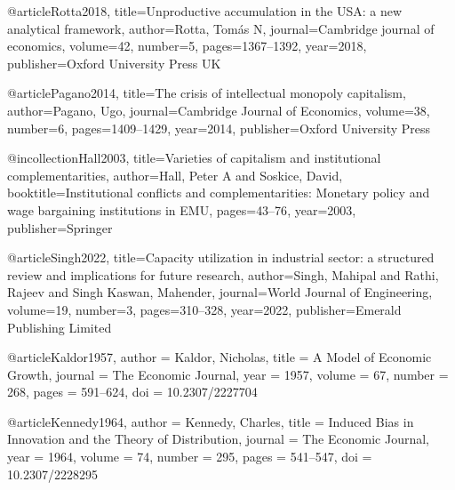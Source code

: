 @article{Rotta2018,
	title={Unproductive accumulation in the USA: a new analytical framework},
	author={Rotta, Tom{\'a}s N},
	journal={Cambridge journal of economics},
	volume={42},
	number={5},
	pages={1367--1392},
	year={2018},
	publisher={Oxford University Press UK}
}

@article{Pagano2014,
	title={The crisis of intellectual monopoly capitalism},
	author={Pagano, Ugo},
	journal={Cambridge Journal of Economics},
	volume={38},
	number={6},
	pages={1409--1429},
	year={2014},
	publisher={Oxford University Press}
}


@incollection{Hall2003,
	title={Varieties of capitalism and institutional complementarities},
	author={Hall, Peter A and Soskice, David},
	booktitle={Institutional conflicts and complementarities: Monetary policy and wage bargaining institutions in EMU},
	pages={43--76},
	year={2003},
	publisher={Springer}
}



@article{Singh2022,
	title={Capacity utilization in industrial sector: a structured review and implications for future research},
	author={Singh, Mahipal and Rathi, Rajeev and Singh Kaswan, Mahender},
	journal={World Journal of Engineering},
	volume={19},
	number={3},
	pages={310--328},
	year={2022},
	publisher={Emerald Publishing Limited}
}

@article{Kaldor1957,
	author  = {Kaldor, Nicholas},
	title   = {A Model of Economic Growth},
	journal = {The Economic Journal},
	year    = {1957},
	volume  = {67},
	number  = {268},
	pages   = {591--624},
	doi     = {10.2307/2227704}
}

@article{Kennedy1964,
	author  = {Kennedy, Charles},
	title   = {Induced Bias in Innovation and the Theory of Distribution},
	journal = {The Economic Journal},
	year    = {1964},
	volume  = {74},
	number  = {295},
	pages   = {541--547},
	doi     = {10.2307/2228295}
}

